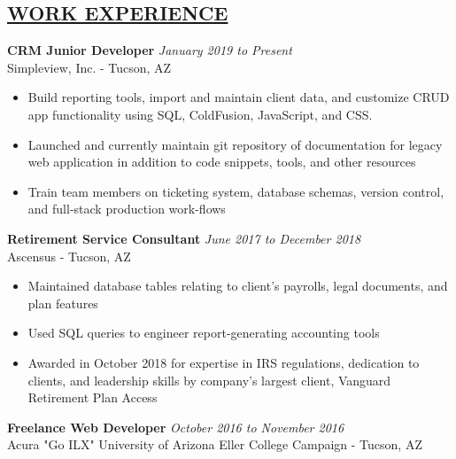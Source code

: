 \documentclass[10pt]{res} %
\begin{document}
 
 
\address{Tucson, AZ $|$ xmclallen@gmail.com $|$ (910) 916-0948}        
         
                        
\begin{resume}                         

\section{\underline{WORK EXPERIENCE}}
\vspace{4pt}
  {\bf CRM Junior Developer} \hfill{\sl January 2019 to Present}\\
  Simpleview, Inc. - Tucson, AZ
  
   \begin{itemize} %
   \item Build reporting tools, import and maintain client data, and customize CRUD app functionality using SQL, ColdFusion, JavaScript, and CSS.
   \item Launched and currently maintain git repository of documentation for legacy web application in addition to code snippets, tools, and other resources
   \item Train team members on ticketing system, database schemas, version control, and full-stack production work-flows
   \end{itemize}


  {\bf Retirement Service Consultant} \hfill  {\sl June 2017 to December 2018}\\
  Ascensus - Tucson, AZ
  
   \begin{itemize} %
   \item Maintained database tables relating to client’s payrolls, legal documents, and plan features
   \item Used SQL queries to engineer report-generating accounting tools
   \item Awarded in October 2018 for expertise in IRS regulations, dedication to clients, and leadership skills by company's largest client, Vanguard Retirement Plan Access
   \end{itemize}


  {\bf Freelance Web Developer} \hfill  {\sl October 2016 to November 2016}\\
  Acura "Go ILX" University of Arizona Eller College Campaign - Tucson, AZ
  

\end{resume}
\end{document}
